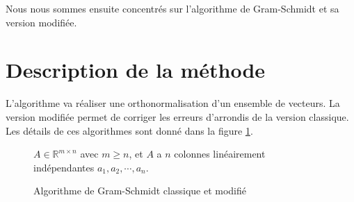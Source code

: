 \documentclass[a4paper]{article}
\begin{document}
Nous nous sommes ensuite concentrés sur l'algorithme de Gram-Schmidt et sa version modifiée.

\section{Description de la méthode}

L'algorithme va réaliser une orthonormalisation d'un ensemble de vecteurs.
La version modifiée permet de corriger les erreurs d'arrondis de la version classique. Les détails de ces algorithmes sont donné dans la figure \ref{fig:algo_gs}.

\begin{figure}
	\begin{center}
    $A \in \mathbb{R}^{m \times n}$ avec $m \geq n$, et $A$ a $n$ colonnes linéairement indépendantes $a_{1}, a_{2}, \cdots, a_{n}$.
    \vskip 0.5cm
    \begin{minipage}[l]{0.35\linewidth}
      \end{minipage}
      \hspace{1cm}
      \begin{minipage}[c]{0.35\linewidth}
      \end{minipage}
      \end{center}
      \caption{Algorithme de Gram-Schmidt classique et modifié}
      \label{fig:algo_gs}
\end{figure}
\end{document}
